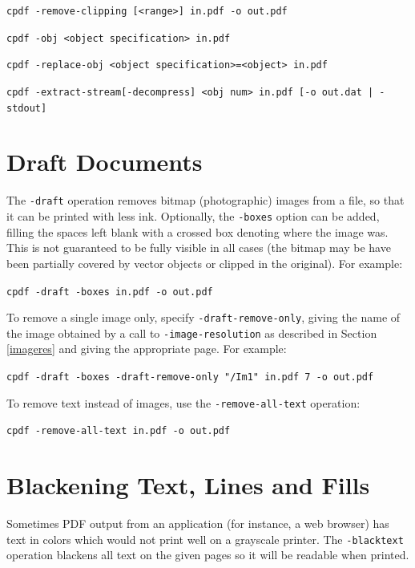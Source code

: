 \documentclass{book}
\begin{document}
{\begin{framed}
  \vspace{1.5mm}
  \noindent\verb!cpdf -remove-clipping [<range>] in.pdf -o out.pdf!

  \vspace{1.5mm}
  \noindent\verb!cpdf -obj <object specification> in.pdf!

  \vspace{1.5mm}
  \noindent\verb!cpdf -replace-obj <object specification>=<object> in.pdf!

  \vspace{1.5mm}
  \noindent\verb!cpdf -extract-stream[-decompress] <obj num> in.pdf [-o out.dat | -stdout]!
  \end{framed}}
  \section{Draft Documents}
\label{draft}
    The \texttt{-draft} operation removes bitmap (photographic) images from a
file, so that it can be printed with less ink. Optionally, the
\texttt{-boxes} option can be added, filling the spaces left blank with a
crossed box denoting where the image was. This is not guaranteed to be fully
visible in all cases (the bitmap may be have been partially covered by vector
objects or clipped in the original). For example:
  \begin{framed}
    \noindent\small\verb!cpdf -draft -boxes in.pdf -o out.pdf!
  \end{framed}

\noindent To remove a single image only, specify \texttt{-draft-remove-only}, giving the name of the image obtained by a call to \texttt{-image-resolution} as described in Section \ref{imageres} and giving the appropriate page. For example:

  \begin{framed}
    \noindent\small\verb!cpdf -draft -boxes -draft-remove-only "/Im1" in.pdf 7 -o out.pdf!
  \end{framed}

\noindent To remove text instead of images, use the \texttt{-remove-all-text} operation:

  \begin{framed}
    \noindent\small\verb!cpdf -remove-all-text in.pdf -o out.pdf!
  \end{framed}

  \section{Blackening Text, Lines and Fills}
  Sometimes PDF output from an application (for instance, a web browser) has
text in colors which would not print well on a grayscale printer. The
\texttt{-blacktext} operation blackens all text on the given pages so it will be readable
when printed.
\end{document}
